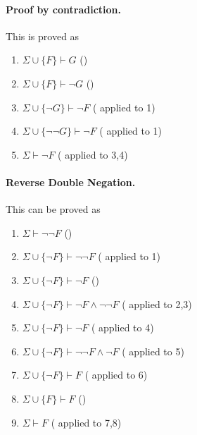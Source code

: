 \paragraph{Proof by contradiction.} %
\begin{prooftree}
\end{prooftree}
This is proved as
\begin{enumerate}
	\item $\Sigma\cup\{F\}\vdash G$ \hfill ()
	\item $\Sigma\cup\{F\}\vdash \neg G$ \hfill ()
	\item $\Sigma\cup\{\neg G\}\vdash \neg F$ \hfill ( applied to 1)
	\item $\Sigma\cup\{\neg \neg G\}\vdash \neg F$ \hfill ( applied to 1)
	\item $\Sigma\vdash \neg F$ \hfill ( applied to 3,4)
\end{enumerate}

\paragraph{Reverse Double Negation.} %
\begin{prooftree}
\end{prooftree}
This can be proved as
\begin{enumerate}
	\item $\Sigma\vdash \neg\neg F$ \hfill ()
	\item $\Sigma\cup\{\neg F\}\vdash \neg\neg F$ \hfill ( applied to 1)
	\item $\Sigma\cup\{\neg F\}\vdash \neg F$ \hfill ()
	\item $\Sigma\cup\{\neg F\}\vdash\neg F\land\neg\neg F$ \hfill ( applied to 2,3)
	\item $\Sigma\cup\{\neg F\}\vdash\neg F$ \hfill ( applied to 4)
	\item $\Sigma\cup\{\neg F\}\vdash\neg\neg F\land\neg F$ \hfill ( applied to 5)
	\item $\Sigma\cup\{\neg F\}\vdash F$ \hfill ( applied to 6)
	\item $\Sigma\cup\{F\}\vdash F$ \hfill ()
	\item $\Sigma\vdash F$ \hfill ( applied to 7,8)
\end{enumerate}

